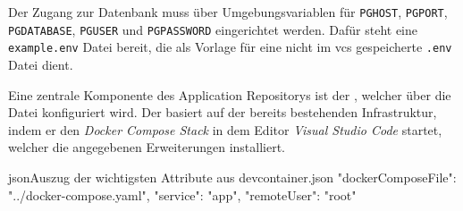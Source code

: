 Der Zugang zur Datenbank muss über Umgebungsvariablen für \texttt{PGHOST}, \texttt{PGPORT}, \texttt{PGDATABASE}, \texttt{PGUSER} und \texttt{PGPASSWORD} eingerichtet werden. Dafür steht eine \texttt{example.env} Datei bereit, die als Vorlage für eine nicht im \Gls{vcs} gespeicherte \texttt{.env} Datei dient.

Eine zentrale Komponente des Application Repositorys ist der , welcher über die  Datei konfiguriert wird. Der  basiert auf der bereits bestehenden Infrastruktur, indem er den \textit{Docker Compose Stack} in dem Editor \textit{Visual Studio Code} startet, welcher die angegebenen Erweiterungen installiert.

\begin{codebox}{json}{Auszug der wichtigsten Attribute aus devcontainer.json}
{
    "dockerComposeFile": "../docker-compose.yaml",
    "service": "app",
    "remoteUser": "root"
}
\end{codebox}
